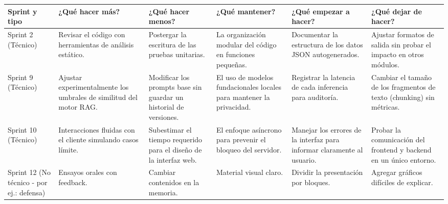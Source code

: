 \documentclass[
11pt, %
]{charter}
\begin{document}
\begin{table}[!ht]
\renewcommand{\arraystretch}{1.4}
\begin{tabular}{|>{\raggedright\arraybackslash}p{1.8cm}|
                >{\raggedright\arraybackslash}p{2.3cm}|
                >{\raggedright\arraybackslash}p{2.3cm}|
                >{\raggedright\arraybackslash}p{2.3cm}|
                >{\raggedright\arraybackslash}p{2.3cm}|
                >{\raggedright\arraybackslash}p{2.3cm}|}
\hline
\rowcolor[HTML]{CCCCCC} 
\textbf{Sprint y tipo} & \textbf{¿Qué hacer más?} & \textbf{¿Qué hacer menos?} & \textbf{¿Qué mantener?} & \textbf{¿Qué empezar a hacer?} & \textbf{¿Qué dejar de hacer?} \\
\hline
Sprint 2 (Técnico) & Revisar el código con herramientas de análisis estático. & Postergar la escritura de las pruebas unitarias. & La organización modular del código en funciones pequeñas. & Documentar la estructura de los datos JSON autogenerados. & Ajustar formatos de salida sin probar el impacto en otros módulos. \\
\hline
Sprint 9 (Técnico) & Ajustar experimentalmente los umbrales de similitud del motor RAG. & Modificar los prompts base sin guardar un historial de versiones. & El uso de modelos fundacionales locales para mantener la privacidad. & Registrar la latencia de cada inferencia para auditoría. & Cambiar el tamaño de los fragmentos de texto (chunking) sin métricas. \\
\hline
Sprint 10 (Técnico) & Interacciones fluidas con el cliente simulando casos límite. & Subestimar el tiempo requerido para el diseño de la interfaz web. & El enfoque asíncrono para prevenir el bloqueo del servidor. & Manejar los errores de la interfaz para informar claramente al usuario. & Probar la comunicación del frontend y backend en un único entorno. \\
\hline
Sprint 12 (No técnico - por ej.: defensa) & Ensayos orales con feedback. & Cambiar contenidos en la memoria. & Material visual claro. & Dividir la presentación por bloques. & Agregar gráficos difíciles de explicar. \\
\hline
\end{tabular}
\end{table}
\end{document}
